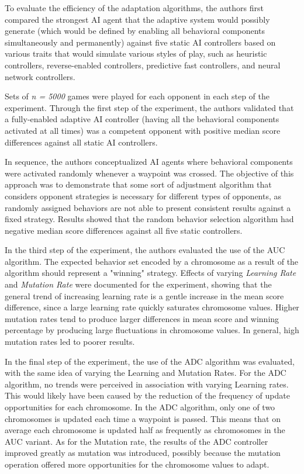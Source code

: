 To evaluate the efficiency of the adaptation algorithms, the authors first compared the strongest AI agent that the adaptive system would possibly generate (which would be defined by enabling all behavioral components simultaneously and permanently) against five static AI controllers based on various traits that would simulate various styles of play, such as heuristic controllers, reverse-enabled controllers, predictive fast controllers, and neural network controllers.

Sets of \emph{n = 5000} games were played for each opponent in each step of the experiment. Through the first step of the experiment, the authors validated that a fully-enabled adaptive AI controller (having all the behavioral components activated at all times) was a competent opponent with positive median score differences against all static AI controllers.

In sequence, the authors conceptualized AI agents where behavioral components were activated randomly whenever a waypoint was crossed. The objective of this approach was to demonstrate that some sort of adjustment algorithm that considers opponent strategies is necessary for different types of opponents, as randomly assigned behaviors are not able to present consistent results against a fixed strategy. Results showed that the random behavior selection algorithm had negative median score differences against all five static controllers.


In the third step of the experiment, the authors evaluated the use of the AUC algorithm. The expected behavior set encoded by a chromosome as a result of the algorithm should represent a "winning" strategy. Effects of varying \emph{Learning Rate} and \emph{Mutation Rate} were documented for the experiment, showing that the general trend of increasing learning rate is a gentle increase in the mean score difference, since a large learning rate quickly saturates chromosome values. Higher mutation rates tend to produce larger differences in mean score and winning percentage by producing large fluctuations in chromosome values. In general, high mutation rates led to poorer results.

In the final step of the experiment, the use of the ADC algorithm was evaluated, with the same idea of varying the Learning and Mutation Rates. For the ADC algorithm, no trends were perceived in association with varying Learning rates. This would likely have been caused by the reduction of the frequency of update opportunities for each chromosome. In the ADC algorithm, only one of two chromosomes is updated each time a waypoint is passed. This means that on average each chromosome is updated half as frequently as chromosomes in the AUC variant. As for the Mutation rate, the results of the ADC controller improved greatly as mutation was introduced, possibly because the mutation operation offered more opportunities for the chromosome values to adapt.

